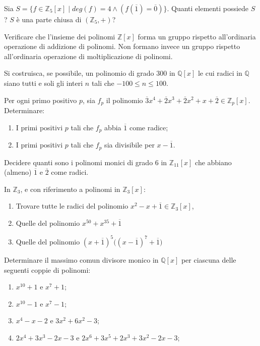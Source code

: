 \begin{exsbox}
	Sia $S=\{f \in \mathbb{Z}_{5}[x] \; | \; deg(f)=4 \land (f(\overline{1})=\overline{0})\}$. Quanti elementi possiede $S$? $S$ è una parte chiusa di $(\mathbb{Z}_{5},+)$?
\end{exsbox}
\begin{exsbox}
	Verificare che l'insieme dei polinomi $\mathbb{Z}[x]$ forma un gruppo rispetto all'ordinaria operazione di addizione di polinomi. Non formano invece un gruppo rispetto all'ordinaria operazione di moltiplicazione di polinomi.
\end{exsbox}
\begin{exsbox}
	Si costruisca, se possibile, un polinomio di grado 300 in $\mathbb{Q}[x]$ le cui radici in $\mathbb{Q}$ siano tutti e soli gli interi $n$ tali che $-100 \leq n \leq 100$.
\end{exsbox}
\begin{exsbox}
	Per ogni primo positivo $p$, sia $f_{p}$ il polinomio $\overline{3}x^{4}+ \overline{2}x^{3}+\overline{2}x^{2}+x+\overline{2} \in \mathbb{Z}_{p}[x]$. Determinare:
	\begin{enumerate}
		\item I primi positivi $p$ tali che $f_{p}$ abbia $\overline{1}$ come radice;
		\item I primi positivi $p$ tali che $f_{p}$ sia divisibile per $x - \overline{1}$.
	\end{enumerate}
\end{exsbox}
\begin{exsbox}
	Decidere quanti sono i polinomi monici di grado 6 in $\mathbb{Z}_{11}[x]$ che abbiano (almeno) $\overline{1}$ e $\overline{2}$ come radici.
\end{exsbox}
\begin{exsbox}
	In $\mathbb{Z}_{3}$, e con riferimento a polinomi in $\mathbb{Z}_{3}[x]$:
	\begin{enumerate}
		\item Trovare tutte le radici del polinomio $x^{2}-x+\overline{1} \in \mathbb{Z}_{3}[x]$,
		\item Quelle del polinomio $x^{50}+x^{35}+\overline{1}$
		\item Quelle del polinomio $(x+\overline{1})^{5}\bigl((x-\overline{1})^{7}+\overline{1}\bigr)$
	\end{enumerate}
\end{exsbox}
\begin{exsbox}
	Determinare il massimo comun divisore monico in $\mathbb{Q}[x]$ per ciascuna delle seguenti coppie di polinomi:
	\begin{enumerate}
		\item $x^{10}+1$ e $x^{7}+1$;
		\item $x^{10}-1$ e $x^{7}-1$;
		\item $x^{4}-x-2$ e $3x^{2}+6x^{2}-3$;
		\item $2x^{4}+3x^{3}-2x-3$ e $2x^{6}+3x^{5}+2x^{3}+3x^{2}-2x-3$;
	\end{enumerate}
\end{exsbox}
